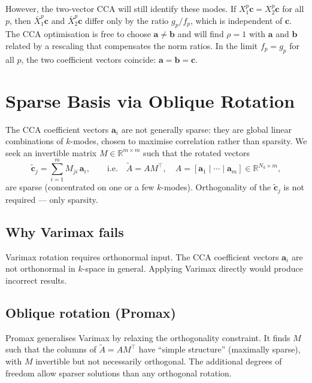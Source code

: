 \documentclass[a4paper,11pt]{article}
\newcommand{\va}{\bm{a}}
\newcommand{\vb}{\bm{b}}
\newcommand{\vc}{\bm{c}}
\newcommand{\vct}{\tilde{\bm{c}}}
\newcommand{\Xb}[2]{X_{#1}^{#2}}
\newcommand{\Xn}[2]{\bar{X}_{#1}^{#2}}
\newcommand{\Nk}{N_k}
\theoremstyle{plain}
\begin{document}
However, the two-vector CCA will still identify these modes.
If $\Xb{1}{p}\vc = \Xb{2}{p}\vc$ for all $p$, then $\Xn{1}{p}\vc$ and $\Xn{2}{p}\vc$ differ only by the ratio $g_p/f_p$, which is independent of $\vc$.
The CCA optimisation is free to choose $\va \neq \vb$ and will find $\rho = 1$ with $\va$ and $\vb$ related by a rescaling that compensates the norm ratios.
In the limit $f_p = g_p$ for all $p$, the two coefficient vectors coincide: $\va = \vb = \vc$.

\section{Sparse Basis via Oblique Rotation}
\label{sec:sparsity}

The CCA coefficient vectors $\va_i$ are not generally sparse: they are global linear combinations of $k$-modes, chosen to maximise correlation rather than sparsity.
We seek an invertible matrix $M \in \mathbb{R}^{m \times m}$ such that the rotated vectors
\begin{equation}
    \vct_j = \sum_{i=1}^{m} M_{ji} \, \va_i, \qquad \text{i.e.} \quad \tilde{A} = A M^\top, \quad A = [\va_1 \mid \cdots \mid \va_m] \in \mathbb{R}^{\Nk \times m},
    \label{eq:rotation}
\end{equation}
are sparse (concentrated on one or a few $k$-modes).
Orthogonality of the $\vct_j$ is not required --- only sparsity.

\subsection{Why Varimax fails}
\label{sec:varimax}

Varimax rotation requires orthonormal input.
The CCA coefficient vectors $\va_i$ are not orthonormal in $k$-space in general.
Applying Varimax directly would produce incorrect results.

\subsection{Oblique rotation (Promax)}
\label{sec:promax}

Promax generalises Varimax by relaxing the orthogonality constraint.
It finds $M$ such that the columns of $\tilde{A} = A M^\top$ have ``simple structure'' (maximally sparse), with $M$ invertible but not necessarily orthogonal.
The additional degrees of freedom allow sparser solutions than any orthogonal rotation.
\end{document}
